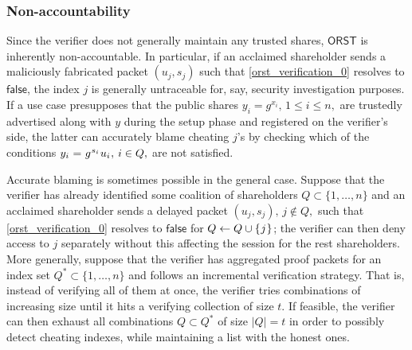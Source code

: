 \documentclass{iacrtrans}
\begin{document}
\subsubsection{Non-accountability}\label{section_non_accountability}
Since the verifier does not generally
maintain any trusted shares,
$\mathsf{ORST}$ is inherently non-accountable.
In particular, if an acclaimed shareholder sends
a maliciously fabricated packet $(u_j, s_j)$
such that \eqref{orst_verification_0}
resolves to $\mathsf{false}$, the index $j$
is generally untraceable
for, say, security investigation purposes.
If a use case presupposes that the
public shares $y_i=g^{x_i},\hspace{2pt} 1 \le i \le n,$
are trustedly advertised along with $y$ during the setup phase
and registered on the verifier's side,
the latter can accurately blame cheating $j$'s by
checking which of the conditions
$
y_i \hspace{0.5pt}
=
\hspace{0.5pt}
g^{\hspace{0.5pt}s_i}\hspace{0.5pt} u_i\hspace{0.5pt},
\hspace{2pt} i \in Q,
$
are not satisfied.

Accurate blaming is sometimes possible in the general case.
Suppose that the verifier has already
identified some coalition of shareholders
$Q \subset \{1, \dots, n\}$
and an acclaimed shareholder sends a delayed packet
$(u_j, s_j),\hspace{2pt} j \not \in Q,$ such that
\eqref{orst_verification_0}
resolves to $\mathsf{false}$
for $Q \leftarrow Q \cup \{\hspace{0.5pt}j\hspace{0.5pt}\}$;
the verifier can then deny access to $j$ separately
without this affecting the session for the rest shareholders.
More generally, suppose that the verifier has aggregated
proof packets for an index set $Q^* \subset \{1, \dots, n\}$
and follows an incremental verification strategy.
That is, instead of verifying all of them at once,
the verifier tries combinations of increasing size until
it hits a verifying collection of size $t$.
If feasible, the verifier can then exhaust all combinations
$Q \subset Q^*$ of size $|Q| = t$ in order
to possibly detect cheating indexes, while maintaining a list
with the honest ones.
\end{document}
